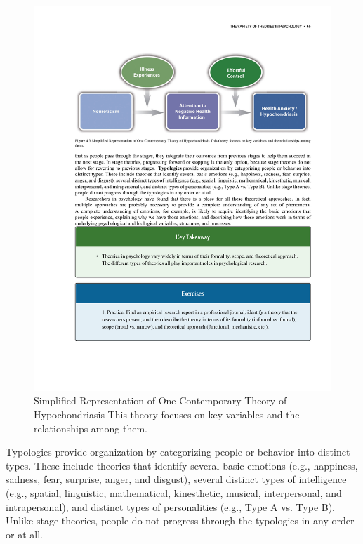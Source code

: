 \begin{figure}
 
      \includegraphics[width=\linewidth]{figures/C4Hypo.pdf}
 
      \caption{Simplified Representation of One Contemporary Theory of Hypochondriasis This theory focuses on key variables and the relationships among them.
}
 
      \label{fig:Hypo}
 
\end{figure}

Typologies provide organization by categorizing people or behavior into distinct types. These include theories that identify several basic emotions (e.g., happiness, sadness, fear, surprise, anger, and disgust), several distinct types of intelligence (e.g., spatial, linguistic, mathematical, kinesthetic, musical, interpersonal, and intrapersonal), and distinct types of personalities (e.g., Type A vs. Type B). Unlike stage theories, people do not progress through the typologies in any order or at all.

